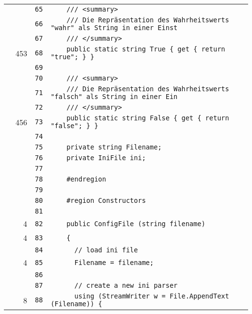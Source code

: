 \documentclass[a4paper,10pt]{article}
\begin{document}
\begin{longtable}[l]{lrrl}
\cellcolor{gray} &  & \verb~65~ & \verb~    /// <summary>~\\
\cellcolor{gray} &  & \verb~66~ & \verb~    /// Die Repräsentation des Wahrheitswerts "wahr" als String in einer Einst~\\
\cellcolor{gray} &  & \verb~67~ & \verb~    /// </summary>~\\
\cellcolor{green} & 453 & \verb~68~ & \verb~    public static string True { get { return "true"; } }~\\
\cellcolor{gray} &  & \verb~69~ & \verb~~\\
\cellcolor{gray} &  & \verb~70~ & \verb~    /// <summary>~\\
\cellcolor{gray} &  & \verb~71~ & \verb~    /// Die Repräsentation des Wahrheitswerts "falsch" als String in einer Ein~\\
\cellcolor{gray} &  & \verb~72~ & \verb~    /// </summary>~\\
\cellcolor{green} & 456 & \verb~73~ & \verb~    public static string False { get { return "false"; } }~\\
\cellcolor{gray} &  & \verb~74~ & \verb~~\\
\cellcolor{gray} &  & \verb~75~ & \verb~    private string Filename;~\\
\cellcolor{gray} &  & \verb~76~ & \verb~    private IniFile ini;~\\
\cellcolor{gray} &  & \verb~77~ & \verb~~\\
\cellcolor{gray} &  & \verb~78~ & \verb~    #endregion~\\
\cellcolor{gray} &  & \verb~79~ & \verb~~\\
\cellcolor{gray} &  & \verb~80~ & \verb~    #region Constructors~\\
\cellcolor{gray} &  & \verb~81~ & \verb~~\\
\cellcolor{green} & 4 & \verb~82~ & \verb~    public ConfigFile (string filename)~\\
\cellcolor{green} & 4 & \verb~83~ & \verb~    {~\\
\cellcolor{gray} &  & \verb~84~ & \verb~      // load ini file~\\
\cellcolor{green} & 4 & \verb~85~ & \verb~      Filename = filename;~\\
\cellcolor{gray} &  & \verb~86~ & \verb~~\\
\cellcolor{gray} &  & \verb~87~ & \verb~      // create a new ini parser~\\
\cellcolor{green} & 8 & \verb~88~ & \verb~      using (StreamWriter w = File.AppendText (Filename)) {~\\

\end{longtable}
\end{document}
